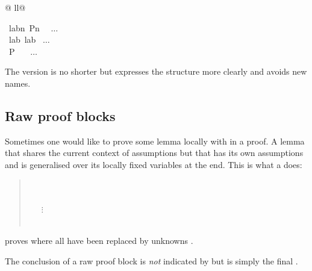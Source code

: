 \begin{isabellebody}
\begin{tabular}{@ {}ll@ {}}
\begin{minipage}[t]{.4\textwidth}
{\isamarkupfalse%
\ lab\isactrlisub n{}\ {}P\isactrlisub n{}\ %
\ $\dots$\\
\isamarkupfalse%
\ lab\ lab%
\ $\dots$\\
\isamarkupfalse%
\ {}P{}\ \ %
\ $\dots$\\
%
\endisatagproof
{\isafoldproof}%
%
\isadelimproof
%
\endisadelimproof
%
}
\end{minipage}
\end{tabular}
\begin{isamarkuptext}%
The  version is no shorter but expresses the structure more
clearly and avoids new names.

\subsection{Raw proof blocks}

Sometimes one would like to prove some lemma locally with in a proof.
A lemma that shares the current context of assumptions but that
has its own assumptions and is generalised over its locally fixed
variables at the end. This is what a  does:
\begin{quote}
  \\
\mbox{}\ \ \  \\
\mbox{}\ \ \ $\vdots$\\
\mbox{}\ \ \  \\
\end{quote}
proves 
where all  have been replaced by unknowns .
\begin{warn}
The conclusion of a raw proof block is \emph{not} indicated by 
but is simply the final .
\end{warn}


\end{isamarkuptext}
\end{isabellebody}
